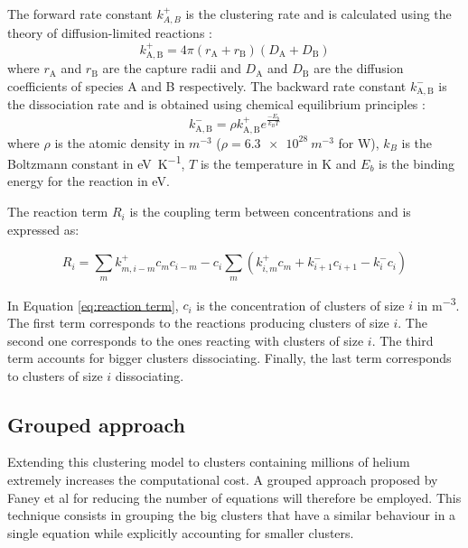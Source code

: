 The forward rate constant $k^+_{A,B}$ is the clustering rate and is calculated using the theory of diffusion-limited reactions :
\begin{equation}
    k^+_\mathrm{A,B} = 4 \pi (r_\mathrm{A} + r_\mathrm{B}) (D_\mathrm{A} + D_\mathrm{B})
\end{equation}
where $r_\mathrm{A}$ and $r_\mathrm{B}$ are the capture radii and $D_\mathrm{A}$ and $D_\mathrm{B}$ are the diffusion coefficients of species A and B respectively.
The backward rate constant $k^-_\mathrm{A,B}$ is the dissociation rate and is obtained using chemical equilibrium principles \cite{goldstein_diffusion_2007}:
\begin{equation}
    k^-_\mathrm{A,B} =\rho k^+_\mathrm{A,B}e^{\frac{-E_b}{k_B T}}
\end{equation}
where $\rho$ is the atomic density in $\si{m^{-3}}$ ($\rho = \SI{6.3e28}{m^{-3}}$ for W), $k_B$ is the Boltzmann constant in \si{eV.K^{-1}}, $T$ is the temperature in \si{K} and $E_b$ is the binding energy for the reaction  in \si{eV}.

The reaction term $R_i$ is the coupling term between concentrations and is expressed as:

\begin{equation}
    R_i=  \sum_{m} k^+_{m,i-m} c_m c_{i-m}  - c_i \sum_m \left( k_{i, m}^+ c_{m} + k_{i+1}^- c_{i+1} -  k_i^- c_i \right)
    \label{eq:reaction term}
\end{equation}


In Equation \ref{eq:reaction term}, $c_i$ is the concentration of clusters of size $i$ in \si{m^{-3}}.
The first term corresponds to the reactions producing clusters of size $i$.
The second one corresponds to the ones reacting with clusters of size $i$.
The third term accounts for bigger clusters dissociating.
Finally, the last term corresponds to clusters of size $i$ dissociating.

\subsection{Grouped approach}
Extending this clustering model to clusters containing millions of helium extremely increases the computational cost.
A grouped approach proposed by Faney et al  for reducing the number of equations will therefore be employed.
This technique consists in grouping the big clusters that have a similar behaviour in a single equation while explicitly accounting for smaller clusters.

